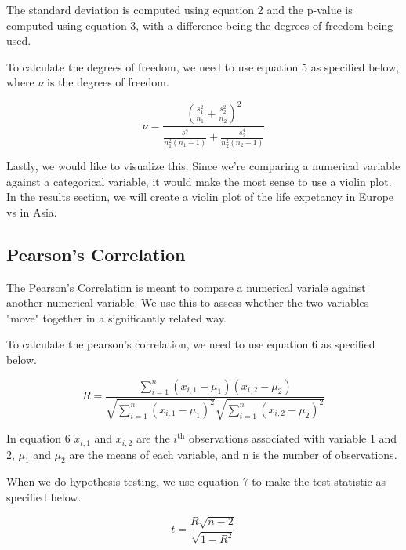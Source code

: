 \documentclass[a4paper, twocolumn]{article}
\begin{document}
The standard deviation is computed using equation 2 and the p-value is computed using equation 3, with a difference
being the degrees of freedom being used. 

To calculate the degrees of freedom, we need to use equation 5 as specified below, where $\nu$ is the degrees of
freedom.

\begin{equation}
    \nu = \frac{\left(\frac{s_1^2}{n_1} + \frac{s_2^2}{n_2} \right)^2}
{\frac{s_1^4}{n_1^2 (n_1 - 1)} + \frac{s_2^4}{n_2^2 (n_2 - 1)}}
    \label{eq:degree-of-freedom}
\end{equation}
\begin{center}
\end{center}

Lastly, we would like to visualize this. Since we're comparing a numerical variable against a categorical variable,
it would make the most sense to use a violin plot. In the results section, we will create a violin plot of the life 
expetancy in Europe vs in Asia.

\subsection{Pearson's Correlation}
The Pearson's Correlation is meant to compare a numerical variale against another numerical variable. We use this to
assess whether the two variables "move" together in a significantly related way. 

To calculate the pearson's correlation, we need to use equation 6 as specified below.

\begin{equation}
    R = \frac{\sum_{i=1}^{n} (x_{i,1} - \mu_1)(x_{i,2} - \mu_2)}
{\sqrt{\sum_{i=1}^{n} (x_{i,1} - \mu_1)^2} \sqrt{\sum_{i=1}^{n} (x_{i,2} - \mu_2)^2}}
    \label{eq:pearson-coefficient}
\end{equation}
\begin{center}
\end{center}

In equation 6 $x_{i,1}$ and $x_{i,2}$ are the $i^{\text{th}}$ observations associated with variable 1 and 2, 
$\mu_1$ and $\mu_2$ are the means of each variable, and n is the number of observations. 

When we do hypothesis testing, we use equation 7 to make the test statistic as specified below.

\begin{equation}
    t = \frac{R \sqrt{n - 2}}{\sqrt{1 - R^2}}
    \label{eq:test-statistic-pearson-coefficient}
\end{equation}
\begin{center}
\end{center}
\end{document}
